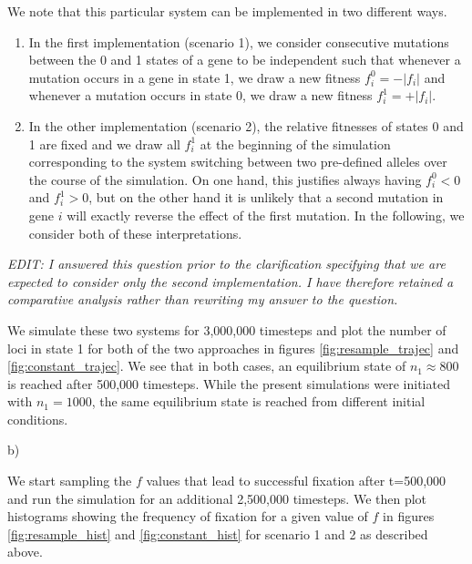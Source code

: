 \documentclass{article}
\begin{document}
We note that this particular system can be implemented in two different ways.
\begin{enumerate}
\item
In the first implementation (scenario 1), we consider consecutive mutations between the 0 and 1 states of a gene to be independent such that whenever a mutation occurs in a gene in state 1, we draw a new fitness $f_i^0 = -|f_i|$ and whenever a mutation occurs in state 0, we draw a new fitness $f_i^1 = +|f_i|$.
\item
In the other implementation (scenario 2), the relative fitnesses of states 0 and 1 are fixed and we draw all $f_i^1$ at the beginning of the simulation corresponding to the system switching between two pre-defined alleles over the course of the simulation. On one hand, this justifies always having $f_i^0 < 0$ and $f_i^1 > 0$, but on the other hand it is unlikely that a second mutation in gene $i$ will exactly reverse the effect of the first mutation. In the following, we consider both of these interpretations.
\end{enumerate}

\textit{EDIT: I answered this question prior to the clarification specifying that we are expected to consider only the second implementation. I have therefore retained a comparative analysis rather than rewriting my answer to the question.}

We simulate these two systems for 3,000,000 timesteps and plot the number of loci in state 1 for both of the two approaches in figures \ref{fig:resample_trajec} and \ref{fig:constant_trajec}. We see that in both cases, an equilibrium state of $n_1 \approx 800$ is reached after 500,000 timesteps. While the present simulations were initiated with $n_1 = 1000$, the same equilibrium state is reached from different initial conditions.

b)

We start sampling the $f$ values that lead to successful fixation after t=500,000 and run the simulation for an additional 2,500,000 timesteps. We then plot histograms showing the frequency of fixation for a given value of $f$ in figures \ref{fig:resample_hist} and \ref{fig:constant_hist} for scenario 1 and 2 as described above.
\end{document}
